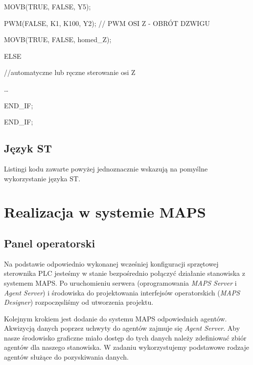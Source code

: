 \documentclass{mwrep}
\begin{document}
\quad \quad \quad MOVB(TRUE, FALSE, Y5);

\quad \quad \quad PWM(FALSE, K1, K100, Y2); // PWM OSI Z - OBRÓT DZWIGU

\quad \quad \quad MOVB(TRUE, FALSE, homed\_Z);

\quad \quad ELSE\quad 

\quad \quad \quad //automatyczne lub ręczne sterowanie osi Z

\quad \quad \quad …

\quad \quad END\_IF;

\quad END\_IF;



\section{Język ST}
\label{PLC::ST}

Listingi kodu zawarte powyżej jednoznacznie wskazują na pomyślne wykorzystanie języka ST.

\chapter{Realizacja w systemie MAPS}
\label{MAPS}

\section{Panel operatorski}
\label{MAPS::PanelOperatorski}

Na podstawie odpowiednio wykonanej wcześniej konfiguracji sprzętowej sterownika PLC jesteśmy w stanie bezpośrednio połączyć działanie stanowiska z systemem MAPS. Po uruchomieniu serwera (oprogramowania \emph{MAPS Server} i \emph{Agent Server}) i środowiska do projektowania interfejsów operatorskich (\emph{MAPS Designer}) rozpoczęsliśmy od utworzenia projektu.

Kolejnym krokiem jest dodanie do systemu MAPS odpowiednich agentów. Akwizycją danych poprzez uchwyty do agentów zajmuje się \emph{Agent Server}. Aby nasze środowisko graficzne miało dostęp do tych danych należy zdefiniować zbiór agentów dla naszego stanowiska. W zadaniu wykorzystujemy podstawowe rodzaje agentów służące do pozyskiwania danych. 
\end{document}
